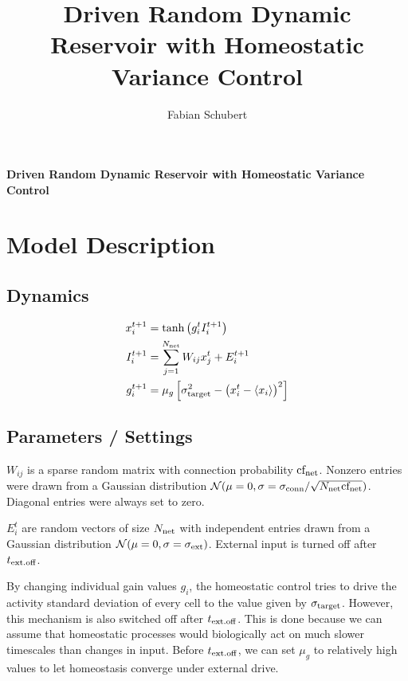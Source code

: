 \documentclass[10pt,a4paper]{article}
\author{Fabian Schubert}
\title{Driven Random Dynamic Reservoir with Homeostatic Variance Control}
\begin{document}
\begin{center}
\begin{LARGE}
\textbf{Driven Random Dynamic Reservoir with Homeostatic Variance Control}\\
\end{LARGE}
\end{center}

\section{Model Description}

\subsection{Dynamics}
\begin{align}
x_i^{t+1} &= \mathrm{tanh}\left( g_i^t I_i^{t+1} \right) \\
I_i^{t+1} &= \sum_{j=1}^{N_{\rm net}} W_{ij} x_j^t + E_i^{t+1} \\
g_i^{t+1} &= \mu_{g} \left[ \sigma_{\rm target}^2 - \left( x_i^t - \langle x_i \rangle \right)^2 \right]
\end{align}

\subsection{Parameters / Settings}

$W_{ij}$ is a sparse random matrix with connection probability ${\rm cf_{net}}$. Nonzero entries were drawn from a Gaussian distribution $\mathcal{N}(\mu = 0,\sigma = \sigma_{\rm conn} / \sqrt{N_{\rm net} {\rm cf_{net}}})$. Diagonal entries were always set to zero.

$E^t_{i}$ are random vectors of size $N_{\rm net}$ with independent entries drawn from a Gaussian distribution $\mathcal{N}(\mu = 0,\sigma = \sigma_{\rm ext})$. External input is turned off after $t_{\rm ext.off}$.

By changing individual gain values $g_i$, the homeostatic control tries to drive the activity standard deviation of every cell to the value given by $\sigma_{\rm target}$. However, this mechanism is also switched off after $t_{\rm ext.off}$. This is done because we can assume that homeostatic processes would biologically act on much slower timescales than changes in input. Before $t_{\rm ext.off}$, we can set $\mu_{g}$ to relatively high values to let homeostasis converge under external drive.
\end{document}
